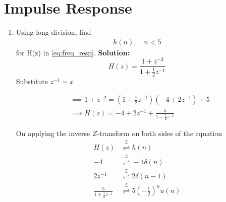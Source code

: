 \documentclass[journal,12pt,twocolumn]{IEEEtran}
\newcommand{\solution}{\noindent \textbf{Solution: }}
\providecommand{\brak}[1]{\ensuremath{\left(#1\right)}}
\providecommand{\ztrans}{\overset{\mathcal{Z}}{ \rightleftharpoons}}
\numberwithin{equation}{section}
\renewcommand\thesection{\arabic{section}}
\begin{document}
\section{Impulse Response}
\begin{enumerate}[label=\thesection.\arabic*]
\item Using long division, 
find
		\begin{align}
			h(n), \quad n < 5
		\end{align}
		for H(z) in 
		\eqref{eq:freq_resp}.
\solution 
	\begin{equation}
		H(z) = \frac{1 + z^{-2}}{1 + \frac12 z^{-1}}
	\end{equation}
	Substitute $z^{-1} = x$
	
	\begin{align}
		&\implies 1 + z^{-2} = \brak{1 + \frac12 z^{-1}}\brak{-4 + 2z^{-1}} + 5 \\
		&\implies H(z) = -4 + 2z^{-1} + \frac{5}{1 + \frac12 z^{-1}}
	\end{align}
	
	On applying the inverse $Z$-transform on both sides of the equation
	\begin{align}
		H(z) &\ztrans h(n) \\
		-4 &\ztrans -4\delta(n) \\
		2z^{-1} &\ztrans 2\delta(n - 1) \\
		\frac{5}{1 + \frac12 z^{-1}} &\ztrans 5\brak{-\frac12}^n u(n) \\
	\end{align}
	

\end{enumerate}
\end{document}
